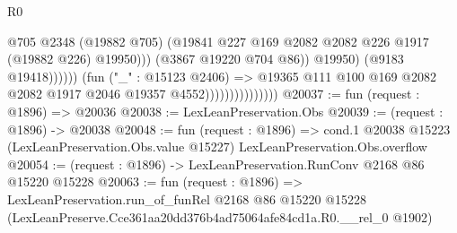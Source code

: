 \begin{lexlean}{R0}
\begin{coremodule}
                                                  @705
                                                  @2348
                                                  (@19882 @705)
                                                  (@19841
                                                    @227
                                                    @169
                                                    @2082
                                                    @2082
                                                    @226
                                                    @1917
                                                    (@19882 @226)
                                                    @19950)))
                                              (@3867 @19220 @704 @86))
                                            @19950)
                                          (@9183 @19418))))))
                                (fun ("_" : @15123 @2406) =>
                                @19365
                                  @111
                                  @100
                                  @169
                                  @2082
                                  @2082
                                  @1917
                                  @2046
                                  @19357
                                  @4552)))))))))))))))
@20037 := fun (request : @1896) => @20036
@20038 := LexLeanPreservation.Obs
@20039 := (request : @1896) -> @20038
@20048 := fun (request : @1896) =>
  cond.{1} @20038 @15223 (LexLeanPreservation.Obs.value @15227) LexLeanPreservation.Obs.overflow
@20054 := (request : @1896) -> LexLeanPreservation.RunConv @2168 @86 @15220 @15228
@20063 := fun (request : @1896) =>
  LexLeanPreservation.run_of_funRel
    @2168
    @86
    @15220
    @15228
    (LexLeanPreserve.Cce361aa20dd376b4ad75064afe84cd1a.R0.__rel_0 @1902)
\end{coremodule}
\end{lexlean}
